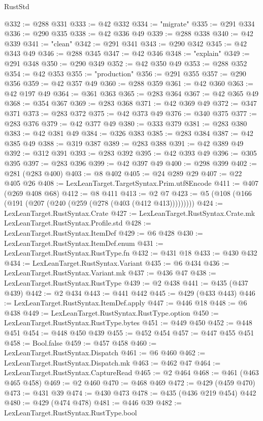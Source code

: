 \begin{lexlean}{RustStd}
\begin{coremodule}
@332 := @288 @331
@333 := @42 @332
@334 := "migrate"
@335 := @291 @334
@336 := @290 @335
@338 := @42 @336 @49
@339 := @288 @338
@340 := @42 @339
@341 := "clean"
@342 := @291 @341
@343 := @290 @342
@345 := @42 @343 @49
@346 := @288 @345
@347 := @42 @346
@348 := "explain"
@349 := @291 @348
@350 := @290 @349
@352 := @42 @350 @49
@353 := @288 @352
@354 := @42 @353
@355 := "production"
@356 := @291 @355
@357 := @290 @356
@359 := @42 @357 @49
@360 := @288 @359
@361 := @42 @360
@363 := @42 @197 @49
@364 := @361 @363
@365 := @283 @364
@367 := @42 @365 @49
@368 := @354 @367
@369 := @283 @368
@371 := @42 @369 @49
@372 := @347 @371
@373 := @283 @372
@375 := @42 @373 @49
@376 := @340 @375
@377 := @283 @376
@379 := @42 @377 @49
@380 := @333 @379
@381 := @283 @380
@383 := @42 @381 @49
@384 := @326 @383
@385 := @283 @384
@387 := @42 @385 @49
@388 := @319 @387
@389 := @283 @388
@391 := @42 @389 @49
@392 := @312 @391
@393 := @283 @392
@395 := @42 @393 @49
@396 := @305 @395
@397 := @283 @396
@399 := @42 @397 @49
@400 := @298 @399
@402 := @281 (@283 @400)
@403 := @8 @402
@405 := @24 @289 @29
@407 := @22 @405 @26
@408 := LexLeanTarget.TargetSyntax.Prim.utf8Encode
@411 := @407 (@269 @408 @68)
@412 := @8 @411
@413 := @2 @7
@423 := @5 (@108 (@166 (@191 (@207 (@240 (@259 (@278 (@403 (@412 @413)))))))))
@424 := LexLeanTarget.RustSyntax.Crate
@427 := LexLeanTarget.RustSyntax.Crate.mk LexLeanTarget.RustSyntax.Profile.std
@428 := LexLeanTarget.RustSyntax.ItemDef
@429 := @6 @428
@430 := LexLeanTarget.RustSyntax.ItemDef.enum
@431 := LexLeanTarget.RustSyntax.RustType.fn
@432 := @431 @18
@433 := @430 @432
@434 := LexLeanTarget.RustSyntax.Variant
@435 := @6 @434
@436 := LexLeanTarget.RustSyntax.Variant.mk
@437 := @436 @47
@438 := LexLeanTarget.RustSyntax.RustType
@439 := @2 @438
@441 := @435 (@437 @439)
@442 := @2 @434
@443 := @441 @442
@445 := @429 (@433 @443)
@446 := LexLeanTarget.RustSyntax.ItemDef.apply
@447 := @446 @18
@448 := @6 @438
@449 := LexLeanTarget.RustSyntax.RustType.option
@450 := LexLeanTarget.RustSyntax.RustType.bytes
@451 := @449 @450
@452 := @448 @451
@454 := @448 @450 @439
@455 := @452 @454
@457 := @447 @455 @451
@458 := Bool.false
@459 := @457 @458
@460 := LexLeanTarget.RustSyntax.Dispatch
@461 := @6 @460
@462 := LexLeanTarget.RustSyntax.Dispatch.mk
@463 := @462 @47
@464 := LexLeanTarget.RustSyntax.CaptureRead
@465 := @2 @464
@468 := @461 (@463 @465 @458)
@469 := @2 @460
@470 := @468 @469
@472 := @429 (@459 @470)
@473 := @431 @39
@474 := @430 @473
@478 := @435 (@436 @219 @454) @442
@480 := @429 (@474 @478)
@481 := @446 @39
@482 := LexLeanTarget.RustSyntax.RustType.bool

\end{coremodule}
\end{lexlean}
